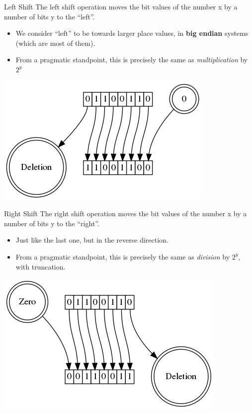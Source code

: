 \documentclass[11pt]{beamer}
\let\OldTexttt\texttt
\renewcommand{\texttt}[1]{\OldTexttt{\color{teal}{#1}}}
\begin{document}
\begin{frame}{Left Shift}
The left shift operation \texttt{x \textless\textless y} moves the bit values of the number x by a number of bits y to the ``left''.  
\begin{itemize}
\item We consider ``left'' to be towards larger place values, in \textbf{big endian} systems (which are most of them).
\item From a pragmatic standpoint, this is precisely the same as \emph{multiplication} by $2^{y}$  
\end{itemize}
\center 
\includegraphics[scale=0.35]{graphs/ls.png}
\end{frame}

\begin{frame}{Right Shift}
The right shift operation \texttt{x \textgreater\textgreater y} moves the bit values of the number x by a number of bits y to the ``right''.  
\begin{itemize}
\item Just like the last one, but in the reverse direction.  
\item From a pragmatic standpoint, this is precisely the same as \emph{division} by $2^{y}$, with truncation.
\end{itemize}
\center 
\includegraphics[scale=0.35]{graphs/rs.png}
\end{frame}
\end{document}
